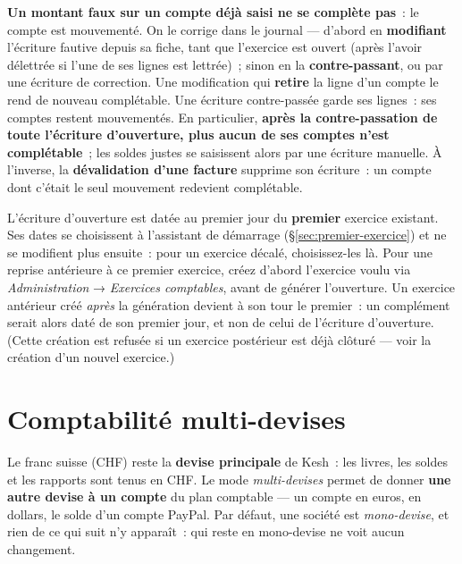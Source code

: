\documentclass[a4paper,11pt,oneside]{article}
\begin{document}
\begin{keshnote}
\textbf{Un montant faux sur un compte déjà saisi ne se complète pas}~: le compte est mouvementé. On le corrige dans le journal --- d'abord en \textbf{modifiant} l'écriture fautive depuis sa fiche, tant que l'exercice est ouvert (après l'avoir délettrée si l'une de ses lignes est lettrée)~; sinon en la \textbf{contre-passant}, ou par une écriture de correction. Une modification qui \textbf{retire} la ligne d'un compte le rend de nouveau complétable. Une écriture contre-passée garde ses lignes~: ses comptes restent mouvementés. En particulier, \textbf{après la contre-passation de toute l'écriture d'ouverture, plus aucun de ses comptes n'est complétable}~; les soldes justes se saisissent alors par une écriture manuelle. À l'inverse, la \textbf{dévalidation d'une facture} supprime son écriture~: un compte dont c'était le seul mouvement redevient complétable.
\end{keshnote}

\begin{keshtip}
L'écriture d'ouverture est datée au premier jour du \textbf{premier} exercice existant. Ses dates se choisissent à l'assistant de démarrage (\S\ref{sec:premier-exercice}) et ne se modifient plus ensuite~: pour un exercice décalé, choisissez-les là. Pour une reprise antérieure à ce premier exercice, créez d'abord l'exercice voulu via \emph{Administration} → \emph{Exercices comptables}, avant de générer l'ouverture. Un exercice antérieur créé \emph{après} la génération devient à son tour le premier~: un complément serait alors daté de son premier jour, et non de celui de l'écriture d'ouverture. (Cette création est refusée si un exercice postérieur est déjà clôturé --- voir la création d'un nouvel exercice.)
\end{keshtip}

\section{Comptabilité multi-devises}\label{sec:multi-devises}

Le franc suisse (CHF) reste la \textbf{devise principale} de Kesh~: les livres, les soldes et les rapports sont tenus en CHF. Le mode \emph{multi-devises} permet de donner \textbf{une autre devise à un compte} du plan comptable --- un compte en euros, en dollars, le solde d'un compte PayPal. Par défaut, une société est \emph{mono-devise}, et rien de ce qui suit n'y apparaît~: qui reste en mono-devise ne voit aucun changement.
\end{document}
